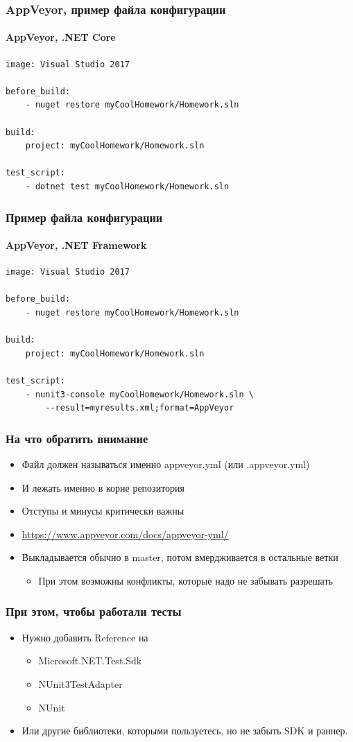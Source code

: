 \documentclass[xetex,mathserif,serif]{beamer}
\begin{document}
	\begin{frame}[fragile]
		\frametitle{AppVeyor, пример файла конфигурации}
		\framesubtitle{AppVeyor, .NET Core}
		\begin{verbatim}
image: Visual Studio 2017 

before_build: 
    - nuget restore myCoolHomework/Homework.sln

build: 
    project: myCoolHomework/Homework.sln

test_script: 
    - dotnet test myCoolHomework/Homework.sln
		\end{verbatim}
	\end{frame}

	\begin{frame}[fragile]
		\frametitle{Пример файла конфигурации}
		\framesubtitle{AppVeyor, .NET Framework}
		\begin{verbatim}
image: Visual Studio 2017 

before_build: 
    - nuget restore myCoolHomework/Homework.sln

build: 
    project: myCoolHomework/Homework.sln

test_script: 
    - nunit3-console myCoolHomework/Homework.sln \ 
        --result=myresults.xml;format=AppVeyor
		\end{verbatim}
	\end{frame}

	\begin{frame}
		\frametitle{На что обратить внимание}
		\begin{itemize}
			\item Файл должен называться именно appveyor.yml (или .appveyor.yml)
			\item И лежать именно в корне репозитория
			\item Отступы и минусы критически важны
			\item \url{https://www.appveyor.com/docs/appveyor-yml/}
			\item Выкладывается обычно в master, потом вмердживается в остальные ветки
			\begin{itemize}
				\item При этом возможны конфликты, которые надо не забывать разрешать
			\end{itemize}
		\end{itemize}
	\end{frame}

	\begin{frame}
		\frametitle{При этом, чтобы работали тесты}
		\begin{itemize}
			\item Нужно добавить Reference на
			\begin{itemize}
				\item Microsoft.NET.Test.Sdk
				\item NUnit3TestAdapter
				\item NUnit
			\end{itemize}
			\item Или другие библиотеки, которыми пользуетесь, но не забыть SDK и раннер.
		\end{itemize}
	\end{frame}
\end{document}
